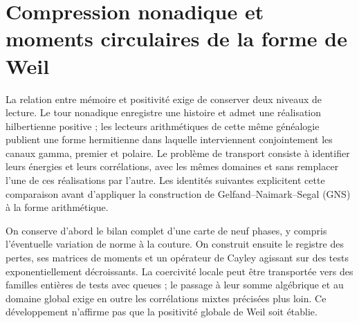 \clearpage
\section[Compression nonadique et moments circulaires de la forme de Weil]{Compression nonadique et\\moments circulaires de la forme de Weil}
\label{viii:sec:transporte-momentos}
\label{viii:tm-add-seccion}

La relation entre mémoire et positivité exige de conserver deux niveaux de lecture. Le tour nonadique enregistre une histoire et admet une réalisation hilbertienne positive ; les lecteurs arithmétiques de cette même généalogie publient une forme hermitienne dans laquelle interviennent conjointement les canaux gamma, premier et polaire. Le problème de transport consiste à identifier leurs énergies et leurs corrélations, avec les mêmes domaines et sans remplacer l'une de ces réalisations par l'autre. Les identités suivantes explicitent cette comparaison avant d'appliquer la construction de Gelfand--Naimark--Segal (GNS) à la forme arithmétique.

On conserve d'abord le bilan complet d'une carte de neuf phases, y compris
l'éventuelle variation de norme à la couture. On construit ensuite le registre
des pertes, ses matrices de moments et un opérateur de Cayley agissant sur
des tests exponentiellement décroissants. La coercivité locale peut être transportée
vers des familles entières de tests avec queues ; le passage à leur somme algébrique et au domaine
global exige en outre les corrélations mixtes précisées plus loin.
Ce développement n'affirme pas que la positivité globale de Weil soit établie.

% 
% 
% 
% 

